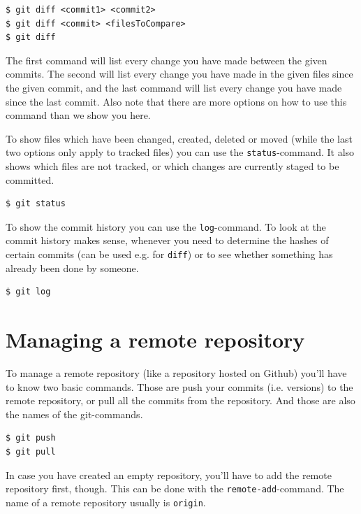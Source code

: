 \documentclass[a4paper, 12pt]{article}
\begin{document}
		\begin{lstlisting}
$ git diff <commit1> <commit2>
$ git diff <commit> <filesToCompare>
$ git diff
		\end{lstlisting}
		
		The first command will list every change you have made between the given commits. The second will list every change you have made in the given files since the given commit, and the last command will list every change you have made since the last commit. Also note that there are more options on how to use this command than we show you here.
		
		To show files which have been changed, created, deleted or moved (while the last two options only apply to tracked files) you can use the \lstinline|status|-command. It also shows which files are not tracked, or which changes are currently staged to be committed.
		
		\begin{lstlisting}
$ git status
		\end{lstlisting}
		
		To show the commit history you can use the \lstinline|log|-command. To look at the commit history makes sense, whenever you need to determine the hashes of certain commits (can be used e.g. for \lstinline|diff|) or to see whether something has already been done by someone.
		
		\begin{lstlisting}
$ git log
		\end{lstlisting}
		
	\section{Managing a remote repository}
	
		To manage a remote repository (like a repository hosted on Github) you'll have to know two basic commands. Those are push your commits (i.e. versions) to the remote repository, or pull all the commits from the repository. And those are also the names of the git-commands.
		
		\begin{lstlisting}
$ git push
$ git pull
		\end{lstlisting}
		
		In case you have created an empty repository, you'll have to add the remote repository first, though. This can be done with the \lstinline|remote-add|-command. The name of a remote repository usually is \lstinline|origin|.
		
\end{document}
